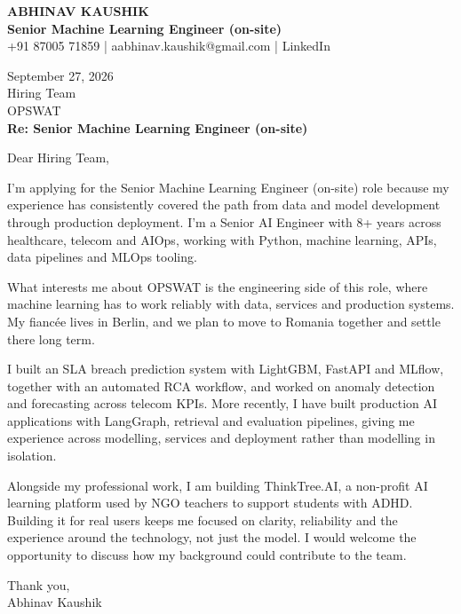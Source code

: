 \documentclass[10pt,a4paper]{article}
\begin{document}
\begin{center}
{\Large\bfseries ABHINAV KAUSHIK}\\[2pt]
{\bfseries Senior Machine Learning Engineer (on-site)}\\[2pt]
+91 87005 71859 \quad | \quad aabhinav.kaushik@gmail.com \quad | \quad LinkedIn
\end{center}
\vspace{8pt}
September 27, 2026\\[6pt]
Hiring Team\\
OPSWAT\\[4pt]
\textbf{Re: Senior Machine Learning Engineer (on-site)}

Dear Hiring Team,

I’m applying for the Senior Machine Learning Engineer (on-site) role because my experience has consistently covered the path from data and model development through production deployment. I’m a Senior AI Engineer with 8+ years across healthcare, telecom and AIOps, working with Python, machine learning, APIs, data pipelines and MLOps tooling.

What interests me about OPSWAT is the engineering side of this role, where machine learning has to work reliably with data, services and production systems. My fiancée lives in Berlin, and we plan to move to Romania together and settle there long term.

I built an SLA breach prediction system with LightGBM, FastAPI and MLflow, together with an automated RCA workflow, and worked on anomaly detection and forecasting across telecom KPIs. More recently, I have built production AI applications with LangGraph, retrieval and evaluation pipelines, giving me experience across modelling, services and deployment rather than modelling in isolation.

Alongside my professional work, I am building ThinkTree.AI, a non-profit AI learning platform used by NGO teachers to support students with ADHD. Building it for real users keeps me focused on clarity, reliability and the experience around the technology, not just the model. I would welcome the opportunity to discuss how my background could contribute to the team.

Thank you,\\
Abhinav Kaushik
\end{document}
